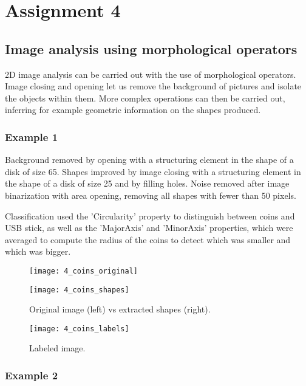 \section{Assignment 4}

\subsection{Image analysis using morphological operators}

2D image analysis can be carried out with the use of morphological operators. Image closing and opening let us remove the background of pictures and isolate the objects within them. More complex operations can then be carried out, inferring for example geometric information on the shapes produced.

\subsubsection{Example 1}

Background removed by opening with a structuring element in the shape of a disk of size 65. Shapes improved by image closing with a structuring element in the shape of a disk of size 25 and by filling holes. Noise removed after image binarization with area opening, removing all shapes with fewer than 50 pixels.

Classification used the 'Circularity' property to distinguish between coins and USB stick, as well as the 'MajorAxis' and 'MinorAxis' properties, which were averaged to compute the radius of the coins to detect which was smaller and which was bigger.

\begin{figure}[h]
\centering
\begin{minipage}{0.45\textwidth}
\texttt{[image: 4\_coins\_original]}
\end{minipage}
\begin{minipage}{0.45\textwidth}
\texttt{[image: 4\_coins\_shapes]}
\end{minipage}
\caption{Original image (left) vs extracted shapes (right).}
\end{figure}
\begin{figure}[h]
\centering
\texttt{[image: 4\_coins\_labels]}
\caption{Labeled image.}
\end{figure}

\newpage

\subsubsection{Example 2}

